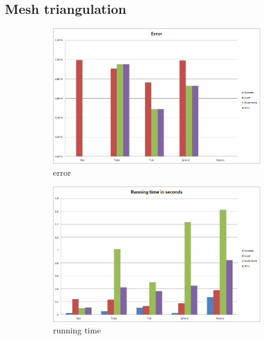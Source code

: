 \documentclass[11pt,twoside,a4paper]{report}
\begin{document}
\subsection{Mesh triangulation}
\begin{figure}[h] \centering 
	\begin{subfigure}[h]{0.49\textwidth} 
	\includegraphics[width=\textwidth]{images/chart_comparison_error}
	\caption{error} \label{fig:comparison_error} \end{subfigure}
    \begin{subfigure}[h]{0.49\textwidth}
	\includegraphics[width=\textwidth]{images/chart_comparison_running_time}
    \caption{running time} \label{fig:comparison_running_time} \end{subfigure}
    \begin{subfigure}[h]{0.49\textwidth}

\end{subfigure}
\end{figure}
\end{document}
